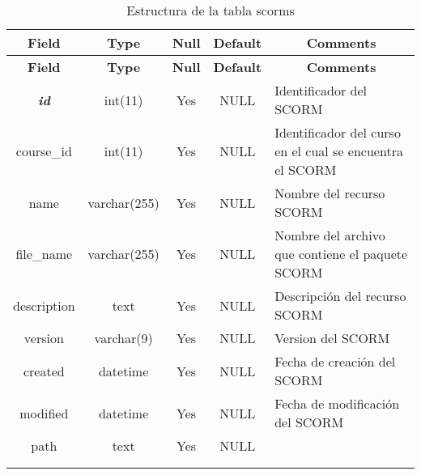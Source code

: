 %
%
\begin{longtable}{c c c c l}
	\multicolumn{1}{c}{\textbf{Field}} &
	\multicolumn{1}{c}{\textbf{Type}} &
	\multicolumn{1}{c}{\textbf{Null}} &
	\multicolumn{1}{c}{\textbf{Default}} &
	\multicolumn{1}{c}{\textbf{Comments}} \\ \hline \hline
\endfirsthead
	\multicolumn{1}{c}{\textbf{Field}} &
	\multicolumn{1}{c}{\textbf{Type}} &
	\multicolumn{1}{c}{\textbf{Null}} &
	\multicolumn{1}{c}{\textbf{Default}} &
	\multicolumn{1}{c}{\textbf{Comments}} \\ \hline \hline
\endhead \endfoot
	\textbf{\textit{id}} & int(11)  & Yes & NULL & \parbox[t]{0.35\textwidth}{Identificador del SCORM} \\ \hline 
	course\_id & int(11) & Yes & NULL & \parbox[t]{0.35\textwidth}{Identificador del curso en el cual se encuentra el SCORM}\\ \hline 
	name & varchar(255) & Yes & NULL & \parbox[t]{0.35\textwidth}{Nombre del recurso SCORM}\\ \hline 
	file\_name & varchar(255) & Yes & NULL & \parbox[t]{0.35\textwidth}{Nombre del archivo que contiene el paquete SCORM}\\ \hline 
	description & text & Yes & NULL & \parbox[t]{0.35\textwidth}{Descripción del recurso SCORM}\\ \hline 
	version & varchar(9) & Yes & NULL & \parbox[t]{0.35\textwidth}{Version del SCORM}\\ \hline 
	created & datetime & Yes & NULL & \parbox[t]{0.35\textwidth}{Fecha de creación del SCORM}\\ \hline 
	modified & datetime & Yes & NULL & \parbox[t]{0.35\textwidth}{Fecha de modificación del SCORM}\\ \hline 
	path & text & Yes & NULL \\ \\ 
 \caption{Estructura de la tabla scorms} \label{tab:scorm_scorms-structure} \\
\end{longtable}

